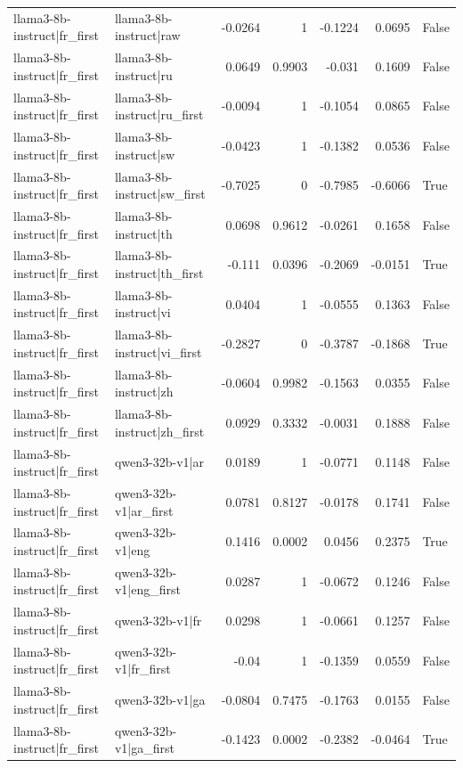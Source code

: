\begin{table}
\begin{tabular}{l l r r r r l}
llama3-8b-instruct|fr_first & llama3-8b-instruct|raw & -0.0264 & 1 & -0.1224 & 0.0695 & False \\
llama3-8b-instruct|fr_first & llama3-8b-instruct|ru & 0.0649 & 0.9903 & -0.031 & 0.1609 & False \\
llama3-8b-instruct|fr_first & llama3-8b-instruct|ru_first & -0.0094 & 1 & -0.1054 & 0.0865 & False \\
llama3-8b-instruct|fr_first & llama3-8b-instruct|sw & -0.0423 & 1 & -0.1382 & 0.0536 & False \\
llama3-8b-instruct|fr_first & llama3-8b-instruct|sw_first & -0.7025 & 0 & -0.7985 & -0.6066 & True \\
llama3-8b-instruct|fr_first & llama3-8b-instruct|th & 0.0698 & 0.9612 & -0.0261 & 0.1658 & False \\
llama3-8b-instruct|fr_first & llama3-8b-instruct|th_first & -0.111 & 0.0396 & -0.2069 & -0.0151 & True \\
llama3-8b-instruct|fr_first & llama3-8b-instruct|vi & 0.0404 & 1 & -0.0555 & 0.1363 & False \\
llama3-8b-instruct|fr_first & llama3-8b-instruct|vi_first & -0.2827 & 0 & -0.3787 & -0.1868 & True \\
llama3-8b-instruct|fr_first & llama3-8b-instruct|zh & -0.0604 & 0.9982 & -0.1563 & 0.0355 & False \\
llama3-8b-instruct|fr_first & llama3-8b-instruct|zh_first & 0.0929 & 0.3332 & -0.0031 & 0.1888 & False \\
llama3-8b-instruct|fr_first & qwen3-32b-v1|ar & 0.0189 & 1 & -0.0771 & 0.1148 & False \\
llama3-8b-instruct|fr_first & qwen3-32b-v1|ar_first & 0.0781 & 0.8127 & -0.0178 & 0.1741 & False \\
llama3-8b-instruct|fr_first & qwen3-32b-v1|eng & 0.1416 & 0.0002 & 0.0456 & 0.2375 & True \\
llama3-8b-instruct|fr_first & qwen3-32b-v1|eng_first & 0.0287 & 1 & -0.0672 & 0.1246 & False \\
llama3-8b-instruct|fr_first & qwen3-32b-v1|fr & 0.0298 & 1 & -0.0661 & 0.1257 & False \\
llama3-8b-instruct|fr_first & qwen3-32b-v1|fr_first & -0.04 & 1 & -0.1359 & 0.0559 & False \\
llama3-8b-instruct|fr_first & qwen3-32b-v1|ga & -0.0804 & 0.7475 & -0.1763 & 0.0155 & False \\
llama3-8b-instruct|fr_first & qwen3-32b-v1|ga_first & -0.1423 & 0.0002 & -0.2382 & -0.0464 & True \\

\end{tabular}
\end{table}
